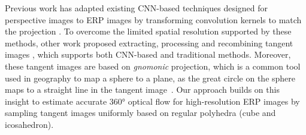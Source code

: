 %
Previous work has adapted existing CNN-based techniques designed for perspective images to ERP images by transforming convolution kernels to match the projection \cite{CoorsCG2018, SuG2019, TatenNT2018}.
%
To overcome the limited spatial resolution supported by these methods, other work proposed extracting, processing and recombining tangent images \cite{EderSLF2020, LuoZSX2019, ZhangLSC2019, LeeJYJY2019, WangHCLYSCS2018, WangYSCT2020}, which supports both CNN-based and traditional methods.
%
%
Moreover, these tangent images are based on \emph{gnomonic} projection, which is a common tool used in geography to map a sphere to a plane, as the great circle on the sphere maps to a straight line in the tangent image~\cite{EderSLF2020}.
%
%
Our approach builds on this insight to estimate accurate 360° optical flow for high-resolution ERP images by sampling tangent images uniformly based on regular polyhedra (cube and icosahedron).



